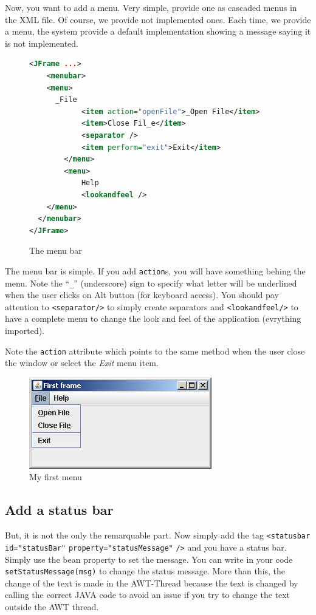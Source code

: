 Now, you want to add a menu. Very simple, provide one as
cascaded menus in the XML file. Of course, we provide not
implemented ones. Each time, we provide a menu, the system
provide a default implementation showing a message saying it
is not implemented.

\begin{figure}[htb]
\begin{lstlisting}[language=XML]
<JFrame ...>
	<menubar>
    <menu>
      _File
			<item action="openFile">_Open File</item>
			<item>Close Fil_e</item>
			<separator />
			<item perform="exit">Exit</item>
		</menu>
		<menu>
			Help
			<lookandfeel />
    </menu>
  </menubar>
</JFrame>
\end{lstlisting}
\caption{The menu bar}\label{fig:menubar}
\end{figure}

The menu bar is simple. If you add \verb|action|s, you will
have something behing the menu. Note the ``\verb|_|'' (underscore)
sign to specify what letter will be underlined when the user
clicks on Alt button (for keyboard access). You should pay
attention to \verb|<separator/>| to simply create separators
and \verb|<lookandfeel/>| to have a complete menu to change
the look and feel of the application (evrything imported).

Note the \verb|action| attribute which points to the same 
method when the user close the window or select the \textit{Exit}
menu item.

\begin{figure}[htb]
\begin{center}
\includegraphics[width=0.5\linewidth]{tuto-2.jpg}
\end{center}
\caption{My first menu\label{fig:tuto-2}}
\end{figure}


\subsection{Add a status bar}

But, it is not the only the remarquable part. Now simply add the tag
\verb|<statusbar| \verb|id="statusBar"| \verb|property="statusMessage"| \verb|/>| and you have a status bar. Simply use the bean property
to set the message. You can write in your code \verb|setStatusMessage(msg)|
to change the status message. More than this, the change of the text is
made in the AWT-Thread because the text is changed by calling the
correct JAVA code to avoid an issue if you try to change the text
outside the AWT thread.

